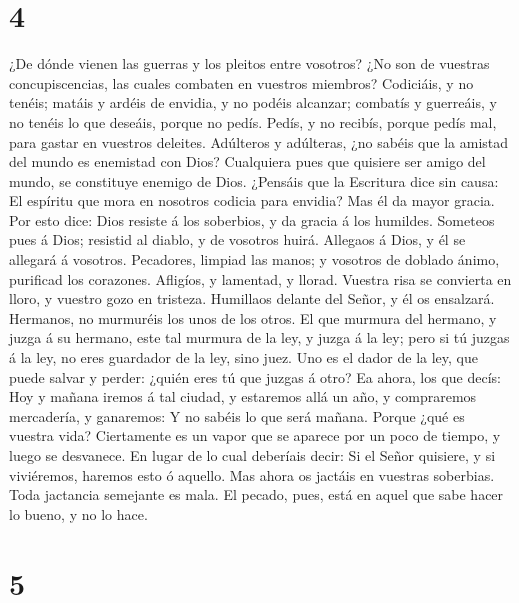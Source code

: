 \hypertarget{section-3}{%
\section{4}\label{section-3}}

 ¿De dónde vienen las guerras y los pleitos entre
vosotros? ¿No son de vuestras concupiscencias, las cuales combaten en
vuestros miembros?  Codiciáis, y no tenéis; matáis y
ardéis de envidia, y no podéis alcanzar; combatís y guerreáis, y no
tenéis lo que deseáis, porque no pedís.  Pedís, y no
recibís, porque pedís mal, para gastar en vuestros deleites.
 Adúlteros y adúlteras, ¿no sabéis que la amistad del
mundo es enemistad con Dios? Cualquiera pues que quisiere ser amigo del
mundo, se constituye enemigo de Dios.  ¿Pensáis que la
Escritura dice sin causa: El espíritu que mora en nosotros codicia para
envidia?  Mas él da mayor gracia. Por esto dice: Dios
resiste á los soberbios, y da gracia á los humildes. 
Someteos pues á Dios; resistid al diablo, y de vosotros huirá.
 Allegaos á Dios, y él se allegará á vosotros. Pecadores,
limpiad las manos; y vosotros de doblado ánimo, purificad los corazones.
 Afligíos, y lamentad, y llorad. Vuestra risa se convierta
en lloro, y vuestro gozo en tristeza.  Humillaos delante
del Señor, y él os ensalzará.  Hermanos, no murmuréis los
unos de los otros. El que murmura del hermano, y juzga á su hermano,
este tal murmura de la ley, y juzga á la ley; pero si tú juzgas á la
ley, no eres guardador de la ley, sino juez.  Uno es el
dador de la ley, que puede salvar y perder: ¿quién eres tú que juzgas á
otro?  Ea ahora, los que decís: Hoy y mañana iremos á tal
ciudad, y estaremos allá un año, y compraremos mercadería, y ganaremos:
 Y no sabéis lo que será mañana. Porque ¿qué es vuestra
vida? Ciertamente es un vapor que se aparece por un poco de tiempo, y
luego se desvanece.  En lugar de lo cual deberíais decir:
Si el Señor quisiere, y si viviéremos, haremos esto ó aquello.
 Mas ahora os jactáis en vuestras soberbias. Toda
jactancia semejante es mala.  El pecado, pues, está en
aquel que sabe hacer lo bueno, y no lo hace.

\hypertarget{section-4}{%
\section{5}\label{section-4}}

